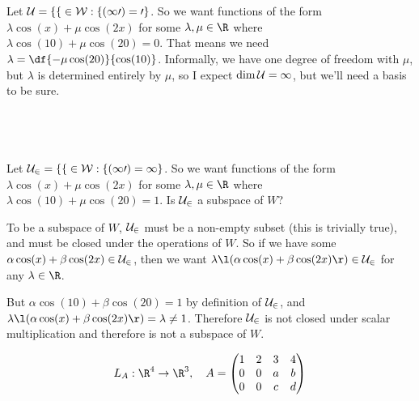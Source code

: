 \documentclass[a4paper]{article}
\begin{document}
\subsection{~}

Let $\cal U = \{ f \in W : f(10) = 0 \}$. So we want functions of the form $\lambda \cos(x) + \mu \cos(2x)$ for some $\lambda, \mu \in \R$ where $\lambda \cos(10) + \mu \cos(20) = 0$. That means we need $\lambda = \df{-\mu \cos(20)}{\cos(10)}$. Informally, we have one degree of freedom with $\mu$, but $\lambda$ is determined entirely by $\mu$, so I expect $\dim \cal U = 1$, but we'll need a basis to be sure.

\subsection{~}

Let $\cal U_2 = \{ f \in W : f(10) = 1 \}$. So we want functions of the form $\lambda \cos(x) + \mu \cos(2x)$ for some $\lambda, \mu \in \R$ where $\lambda \cos(10) + \mu \cos(20) = 1$. Is $\cal U_2$ a subspace of $W$?

To be a subspace of $W$, $\cal U_2$ must be a non-empty subset (this is trivially true), and must be closed under the operations of $W$. So if we have some $\alpha \cos(x) + \beta \cos(2x) \in \cal U_2$, then we want $\lambda \l( \alpha \cos(x) + \beta \cos(2x) \r) \in \cal U_2$ for any $\lambda \in \R$.

But $\alpha \cos(10) + \beta \cos(20) = 1$ by definition of $\cal U_2$, and $\lambda \l( \alpha \cos(x) + \beta \cos(2x) \r) = \lambda \ne 1$. Therefore $\cal U_2$ is not closed under scalar multiplication and therefore is not a subspace of $W$.



$$L_A : \R^4 \to \R^3, \quad A = \begin{pmatrix} 1 & 2 & 3 & 4 \\ 0 & 0 & a & b \\ 0 & 0 & c & d \end{pmatrix}$$

\subsection{~}
\end{document}
